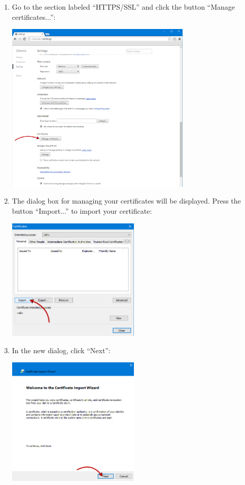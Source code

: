 \documentclass[a4paper,10pt]{article}
\begin{document}
\begin{enumerate}
	\item Go to the section labeled ``HTTPS/SSL'' and click the button ``Manage certificates...'':\\
	\begin{center}\includegraphics[width=0.7\textwidth]{InstallCert03.png}\end{center}
	
	\item The dialog box for managing your certificates will be displayed. Press the button ``Import...'' to import your certificate:\\
	\begin{center}\includegraphics[width=0.5\textwidth]{InstallCert04.png}\end{center}
	
	\item In the new dialog, click ``Next'':\\
	\begin{center}\includegraphics[width=0.5\textwidth]{InstallCert05.png}\end{center}
	

\end{enumerate}
\end{document}
